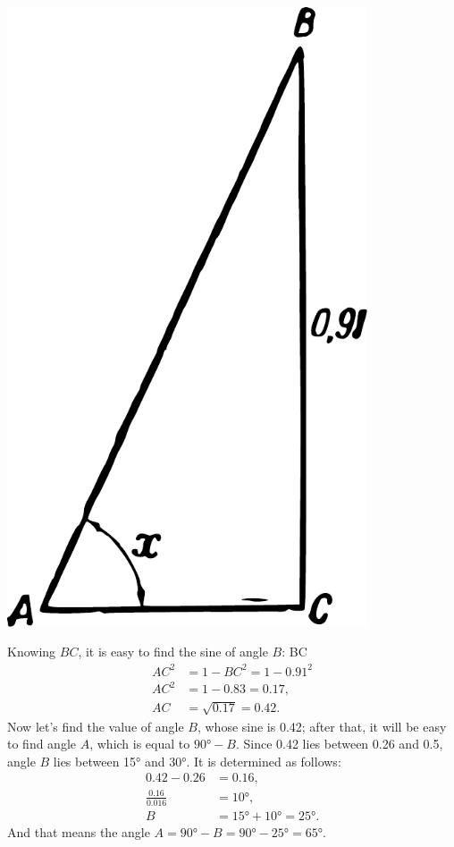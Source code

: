 \begin{marginfigure}%
\centering
\includegraphics[width=0.8\textwidth]{figures/ch-05/fig-091.pdf}
\end{marginfigure}

Knowing $BC$, it is easy to find the sine of angle $B$: BC
\begin{align*}%
AC^{2} & = 1 - BC^{2} = 1 - 0.91^{2}\\
AC^{2} &  = 1 - 0.83 = 0.17,\\
AC & = \sqrt{0.17} = 0.42.
\end{align*}
Now let's find the value of angle $B$, whose sine is 0.42; after that, it will be easy to find angle $A$, which is equal to $\ang{90}  - B$. Since 0.42 lies between 0.26 and 0.5, angle $B$ lies between \ang{15} and \ang{30}. It is determined as follows:
\begin{align*}
0.42 - 0.26 & = 0.16, \\
\frac{0.16}{0.016} & = \ang{10},\\
B & = \ang{15} + \ang{10} = \ang{25}.
\end{align*}
And that means the angle $A = \ang{90} - B = \ang{90} - \ang{25} = \ang{65}.$

